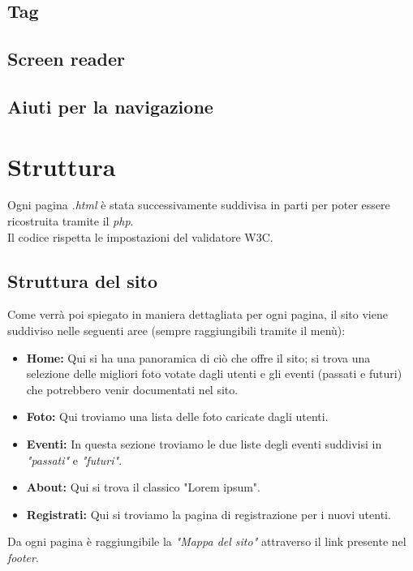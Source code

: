 	\subsection{Tag}
	\subsection{Screen reader}
	\subsection{Aiuti per la navigazione}
	\section{Struttura}
	Ogni pagina \textit{.html} è stata successivamente suddivisa in parti per poter essere ricostruita tramite il \textit{php}.\\ Il codice rispetta le impostazioni del validatore W3C.
	\subsection{Struttura del sito}
	Come verrà poi spiegato in maniera dettagliata per ogni pagina, il sito viene suddiviso nelle seguenti aree (sempre raggiungibili tramite il menù):
	\begin{itemize}
	\item \textbf{Home:} Qui si ha una panoramica di ciò che offre il sito; si trova una selezione delle migliori foto votate dagli utenti e gli eventi (passati e futuri) che potrebbero venir documentati nel sito.
	\item \textbf{Foto:} Qui troviamo una lista delle foto caricate dagli utenti.
	\item \textbf{Eventi:} In questa sezione troviamo le due liste degli eventi suddivisi in \textit{"passati"} e \textit{"futuri"}.
	\item \textbf{About:} Qui si trova il classico "Lorem ipsum".
	\item \textbf{Registrati:} Qui si troviamo la pagina di registrazione per i nuovi utenti.
	\end{itemize}
	Da ogni pagina è raggiungibile la \textit{"Mappa del sito"} attraverso il link presente nel \textit{footer}.
